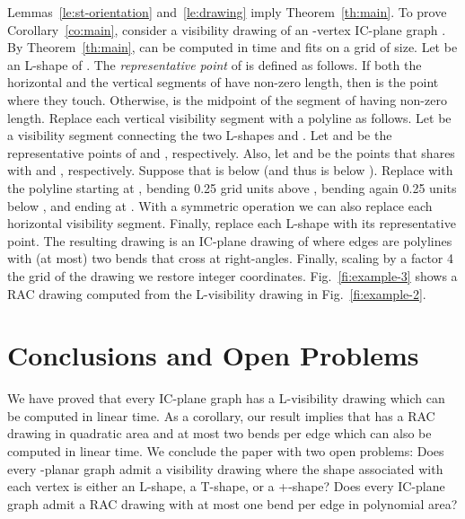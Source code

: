 \documentclass[a4paper]{article}
\begin{document}
Lemmas~\ref{le:st-orientation} and~\ref{le:drawing} imply Theorem~\ref{th:main}. To prove Corollary~\ref{co:main}, consider a visibility drawing  of an -vertex IC-plane graph . By Theorem~\ref{th:main},  can be computed in  time and fits on a grid of  size. Let  be an L-shape of . The \emph{representative point}  of  is defined as follows. If both the horizontal and the vertical segments of  have non-zero length, then  is the point where they touch. Otherwise,  is the midpoint of the segment of   having non-zero length. Replace each vertical visibility segment with a polyline as follows. Let  be a visibility segment connecting the two L-shapes  and . Let  and  be the representative points of  and , respectively.  Also, let  and  be the points that  shares with  and , respectively. Suppose that  is below  (and thus  is below ). Replace  with the polyline starting at , bending 0.25 grid units above , bending again 0.25 units below , and ending at . With a symmetric operation we can also replace each horizontal visibility segment. Finally, replace each L-shape with its representative point. The resulting drawing is an IC-plane drawing of  where edges are polylines with (at most) two bends that cross at right-angles. Finally, scaling by a factor 4 the grid of the drawing we restore integer coordinates. Fig.~\ref{fi:example-3} shows a RAC drawing computed from the L-visibility drawing in Fig.~\ref{fi:example-2}.

\section{Conclusions and Open Problems}\label{se:conclusions}
We have proved that every IC-plane graph  has a L-visibility drawing which can be computed in linear time. As a corollary, our result implies that  has a RAC drawing in quadratic area and at most two bends per edge which can also be computed in linear time. We conclude the paper with two open problems:  Does every -planar graph admit a visibility drawing where the shape associated with each vertex is either an L-shape, a T-shape, or a +-shape?  Does every IC-plane graph admit a RAC drawing with at most one bend per edge in polynomial area?










{\small }

\end{document}
